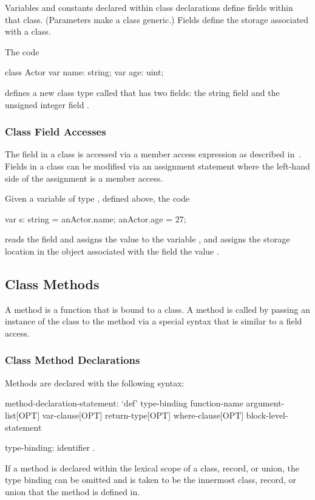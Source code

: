 Variables and constants declared within class declarations define
fields within that class.  (Parameters make a class generic.)  Fields
define the storage associated with a class.

\begin{example}
The code
\begin{chapel}
class Actor {
  var name: string;
  var age: uint;
}
\end{chapel}
defines a new class type called  that has two fields: the
string field  and the unsigned integer field .
\end{example}

\subsubsection{Class Field Accesses}
\label{Class_Field_Accesses}

The field in a class is accessed via a member access expression as
described in~.  Fields in a class can
be modified via an assignment statement where the left-hand side of
the assignment is a member access.
\begin{example}
Given a variable  of type , defined above,
the code
\begin{chapel}
var s: string = anActor.name;
anActor.age = 27;
\end{chapel}
reads the field  and assigns the value to the variable
, and assigns the storage location in the object
 associated with the field  the value
.
\end{example}

\subsection{Class Methods}
\label{Class_Methods}

A method is a function that is bound to a class.  A method is called
by passing an instance of the class to the method via a special
syntax that is similar to a field access.

\subsubsection{Class Method Declarations}
\label{Class_Method_Declarations}

Methods are declared with the following syntax:
\begin{syntax}
method-declaration-statement:
  `def' type-binding function-name argument-list[OPT] var-clause[OPT]
    return-type[OPT] where-clause[OPT] block-level-statement

type-binding:
  identifier .
\end{syntax}
If a method is declared within the lexical scope of a class, record,
or union, the type binding can be omitted and is taken to be the
innermost class, record, or union that the method is defined in.

